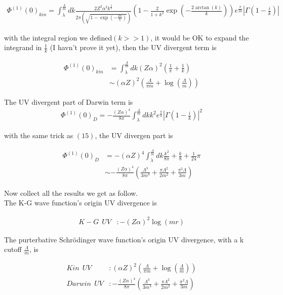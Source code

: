 \documentclass{article}
\begin{document}
\begin{align}
	\Phi^{(1)}(0)_{kin}=\int_\lambda^\frac{\Lambda}{m}dk \frac{2Z^2\alpha^2k^\frac{3}{2}}{2\pi(\sqrt{1-\exp(-\frac{2 \pi}{k})})}(1-\frac{2}{1+k^2}\exp(-\frac{2\arctan(k)}{k}))e^\frac{\pi}{2k}|\Gamma(1-\frac{i}{k})|
\end{align}

with the integral region we defined$(k>>1)$, it would be OK to expand the integrand in $\frac{1}{k}$ (I havn't prove it yet), then the UV divergent term is

\begin{align}
	\Phi^{(1)}(0)_{kin} & =\int_\lambda^\frac{\Lambda}{m}dk(Z\alpha)^2(\frac{1}{\pi}+\frac{1}{k}) \\
	                    & \sim(\alpha Z)^2(\frac{\Lambda}{\pi m}+\log(\frac{\Lambda}{m}))
\end{align}

The UV divergent part of Darwin term is
\begin{align}
	\Phi^{(1)}(0)_D=-\frac{(Z\alpha)^4}{8\pi}\int_\lambda^\frac{\Lambda}{m}dkk^2e^\frac{\pi}{k}|\Gamma(1-\frac{i}{k})|^2
\end{align}

with the same trick as $(15)$, the UV divergen part is

\begin{align}
	\Phi^{(1)}(0)_{D} & =-(\alpha Z)^4\int_\lambda^\frac{\Lambda}{m}dk\frac{k^2}{8\pi}+\frac{k}{8}+\frac{1}{24}\pi               \\
	                  & \sim -\frac{(Z\alpha)^4}{8\pi}(\frac{\Lambda^3}{3m^3}+\frac{\pi\Lambda^2}{2m^2}+\frac{\pi^2\Lambda}{3m})
\end{align}

Now collect all the results we get as follow.\\
The K-G wave function's origin UV divergence is

\begin{align}
	K-G\ \ UV & :-(Z\alpha)^2\log(m r)
\end{align}

The purterbative Schr\"odinger wave function's origin UV divergence, with a k cutoff $\frac{\Lambda}{m}$, is

\begin{align}
	Kin\ \  UV    & :(\alpha Z)^2(\frac{\Lambda}{\pi m}+\log(\frac{\Lambda}{m}))                                         \\
	Darwin\ \  UV & :-\frac{(Z\alpha)^4}{8\pi}(\frac{\Lambda^3}{3m^3}+\frac{\pi\Lambda^2}{2m^2}+\frac{\pi^2\Lambda}{3m})
\end{align}
\end{document}
